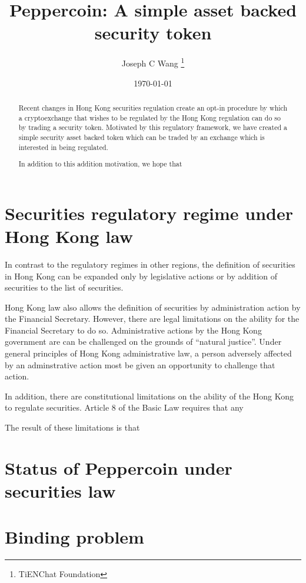 \documentclass[12pt, letterpaper, twoside]{article}
\title{Peppercoin: A simple asset backed security token}
\author{Joseph C Wang \thanks{TiENChat Foundation}}
\date{\today}
\begin{document}
 
\begin{titlepage}
\maketitle
\end{titlepage}

\begin{abstract}
Recent changes in Hong Kong securities regulation create an opt-in
procedure by which a cryptoexchange that wishes to be regulated by the
Hong Kong regulation can do so by trading a security token.  Motivated
by this regulatory framework, we have created a simple security asset
backed token which can be traded by an exchange which is interested in
being regulated.

In addition to this addition motivation, we hope that 
\end{abstract}

\section{Securities regulatory regime under Hong Kong law}

In contrast to the regulatory regimes in other regions, the definition
of securities in Hong Kong can be expanded only by legislative actions
or by addition of securities to the list of securities.

Hong Kong law also allows the definition of securities by
administration action by the Financial Secretary.  However, there are
legal limitations on the ability for the Financial Secretary to do
so.  Administrative actions by the Hong Kong government are can be
challenged on the grounds of ``natural justice''.  Under general
principles of Hong Kong administrative law, a person adversely
affected by an adminstrative action most be given an opportunity to
challenge that action.

In addition, there are constitutional limitations on the ability of
the Hong Kong to regulate securities.  Article 8 of the Basic Law
requires that any

The result of these limitations is that 

\section{Status of Peppercoin under securities law}

\section{Binding problem}
\end{document}
